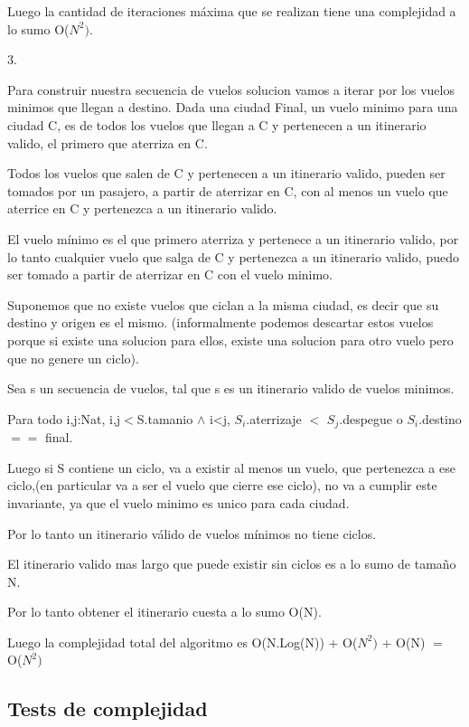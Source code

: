 Luego la cantidad de iteraciones m\'axima que se realizan tiene una complejidad a lo sumo O($N^{2})$.

3.

Para construir nuestra secuencia de vuelos solucion vamos a iterar por los vuelos minimos que llegan a destino.
Dada una ciudad Final, un vuelo minimo para una ciudad C, es de todos los vuelos que llegan a C y pertenecen a un itinerario valido, el primero que aterriza en C. 

Todos los vuelos que salen de C y pertenecen a un itinerario valido, pueden ser tomados por un pasajero, a partir de aterrizar en C, con al menos un vuelo que aterrice en C y pertenezca a un itinerario valido.

El vuelo m\'inimo es el que primero aterriza y pertenece a un itinerario valido, por lo tanto cualquier vuelo que salga de C y pertenezca a un itinerario valido, puedo ser tomado a partir de aterrizar en C con el vuelo minimo.

Suponemos que no existe vuelos que ciclan a la misma ciudad, es decir que su destino y origen es el mismo. (informalmente podemos descartar estos vuelos porque si existe una solucion para ellos, existe una solucion para otro vuelo pero que no genere un ciclo).

Sea s un secuencia de vuelos, tal que s es un itinerario valido de vuelos minimos.

Para todo i,j:Nat, i,j$<$S.tamanio $\wedge$ i<j, $S_{i}$.aterrizaje $<$ $S_{j}$.despegue o $S_{i}$.destino $==$ final.

Luego si S contiene un ciclo, va a existir al menos un vuelo, que pertenezca a ese ciclo,(en particular va a ser el vuelo que cierre ese ciclo), no va a cumplir este invariante, ya que el vuelo minimo es unico para cada ciudad.

Por lo tanto un itinerario v\'alido de vuelos m\'inimos no tiene ciclos. 

El itinerario valido mas largo que puede existir sin ciclos es a lo sumo de tamaño N.

Por lo tanto obtener el itinerario cuesta a lo sumo O(N).


Luego la complejidad total del algoritmo es O(N.Log(N)) + O($N^{2})$ + O(N) $=$ O($N^{2})$
\subsection{Tests de complejidad}
